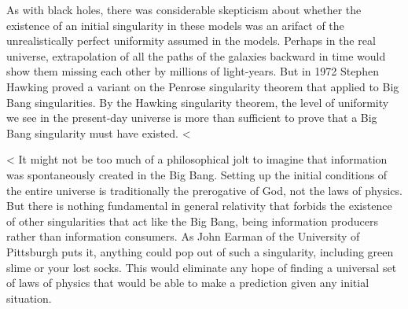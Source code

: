 As with black holes, there was considerable skepticism about whether the existence of an initial singularity in these models
was an arifact of the unrealistically perfect uniformity assumed in the models. Perhaps in the real universe, extrapolation
of all the paths of the galaxies backward in time would show them missing each other by millions of light-years.
But in 1972 Stephen Hawking proved a variant on the Penrose singularity theorem that applied to Big Bang singularities.
By the Hawking singularity theorem, the level of uniformity we see in the present-day universe is more than sufficient to prove
that a Big Bang singularity must have existed.
<%

<%
It might not be too much of a philosophical jolt to imagine that information was spontaneously created in the Big Bang. 
Setting up the initial conditions of the entire universe is traditionally the prerogative of God, not the laws of physics.
But there is nothing fundamental in general relativity that forbids the existence of other singularities
that act like the Big Bang, being information producers rather than information consumers.
As John Earman of the University of Pittsburgh puts it, anything could pop out of such a singularity, including green 
slime or your lost socks. This would eliminate any hope of finding a universal set of laws of physics that would be
able to make a prediction given any initial situation. 

